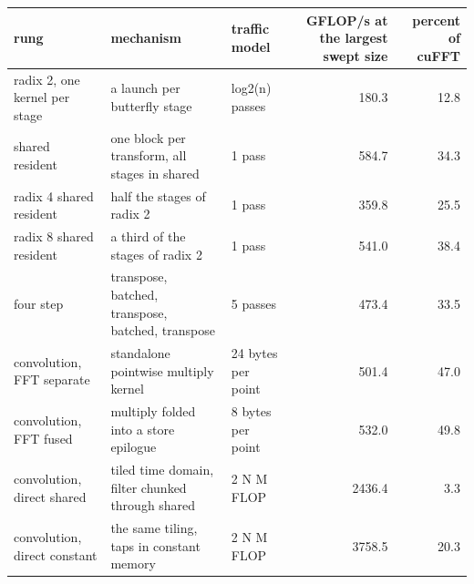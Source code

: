 \begin{tabular}{lllrr}
\toprule
rung & mechanism & traffic model & GFLOP/s at the largest swept size & percent of cuFFT \\
\midrule
radix 2, one kernel per stage & a launch per butterfly stage & log2(n) passes & 180.3 & 12.8 \\
shared resident & one block per transform, all stages in shared & 1 pass & 584.7 & 34.3 \\
radix 4 shared resident & half the stages of radix 2 & 1 pass & 359.8 & 25.5 \\
radix 8 shared resident & a third of the stages of radix 2 & 1 pass & 541.0 & 38.4 \\
four step & transpose, batched, transpose, batched, transpose & 5 passes & 473.4 & 33.5 \\
convolution, FFT separate & standalone pointwise multiply kernel & 24 bytes per point & 501.4 & 47.0 \\
convolution, FFT fused & multiply folded into a store epilogue & 8 bytes per point & 532.0 & 49.8 \\
convolution, direct shared & tiled time domain, filter chunked through shared & 2 N M FLOP & 2436.4 & 3.3 \\
convolution, direct constant & the same tiling, taps in constant memory & 2 N M FLOP & 3758.5 & 20.3 \\
\bottomrule
\end{tabular}
